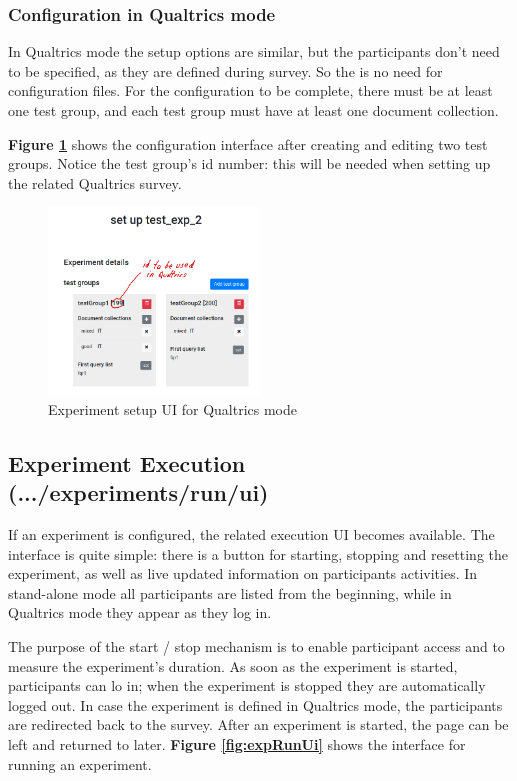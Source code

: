 \documentclass[fleqn]{article}
\begin{document}
\newpage

\subsubsection{Configuration in Qualtrics mode}

In Qualtrics mode the setup options are similar, but the participants don't need to be specified, as they are defined during survey.
So the is no need for configuration files. For the configuration to be complete, there must be at least one test group, and each test group
must have at least one document collection. 

\textbf{Figure \ref{fig:expSetupUi2}} shows the configuration interface after creating and editing
two test groups. Notice the test group's id number: this will be needed when setting up the related Qualtrics survey. 

\begin{figure} [h]
\centering
\includegraphics[width=0.5\textwidth]{img/expSetupUi2}
\caption{Experiment setup UI for Qualtrics mode}
\label{fig:expSetupUi2}
\end{figure}

\newpage

\subsection{Experiment Execution \small{(.../experiments/run/ui)}}

If an experiment is configured, the related execution UI becomes available. The interface is quite simple: there is a button
for starting, stopping and resetting the experiment, as well as live updated information on participants activities.
In stand-alone mode all participants are listed from the beginning, while in Qualtrics mode they appear as they log in.

The purpose of the start / stop mechanism is to enable participant access and to measure the experiment's duration. As
soon as the experiment is started, participants can lo in; when the experiment is stopped they are automatically logged out.
In case the experiment is defined in Qualtrics mode, the participants are redirected back to the survey.
After an experiment is started, the page can be left and returned to later.
\textbf{Figure \ref{fig:expRunUi}} shows the interface for running an experiment.
\end{document}

